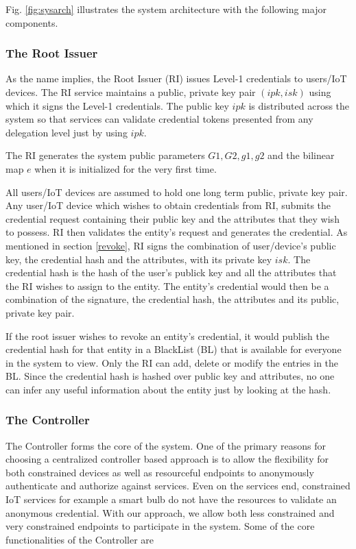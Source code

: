 \documentclass[journal]{IEEEtran}
\begin{document}
Fig. \ref{fig:sysarch} illustrates the system architecture with the following major components.

\subsubsection{The Root Issuer}
As the name implies, the Root Issuer (RI) issues Level-1 credentials to users/IoT devices. The RI service maintains a public, private key pair $(ipk,isk)$ using which it signs the Level-1 credentials. The public key $ipk$ is distributed across the system so that services can validate credential tokens presented from any delegation level just by using $ipk$.

The RI generates the system public parameters $G1, G2, g1, g2$ and the bilinear map $e$ when it is initialized for the very first time.

All users/IoT devices are assumed to hold one long term public, private key pair. Any user/IoT device which wishes to obtain credentials from RI, submits the credential request containing their public key and the attributes that they wish to possess. RI then validates the entity's request and generates the credential. As mentioned in section \ref{revoke}, RI signs the combination of user/device's public key, the credential hash and the attributes, with its private key $isk$. The credential hash is the hash of the user's publick key and all the attributes that the RI wishes to assign to the entity. The entity's credential would then be a combination of the signature, the credential hash, the attributes and its public, private key pair.

If the root issuer wishes to revoke an entity's credential, it would publish the credential hash for that entity in a BlackList (BL) that is available for everyone in the system to view. Only the RI can add, delete or modify the entries in the BL. Since the credential hash is hashed over public key and attributes, no one can infer any useful information about the entity just by looking at the hash.

\subsubsection{The Controller} \label{controller}
The Controller forms the core of the system. One of the primary reasons for choosing a centralized controller based approach is to allow the flexibility for both constrained devices as well as resourceful endpoints to anonymously authenticate and authorize against services. Even on the services end, constrained IoT services for example a smart bulb do not have the resources to validate an anonymous credential. With our approach, we allow both less constrained and very constrained endpoints to participate in the system. Some of the core functionalities of the Controller are
\end{document}
